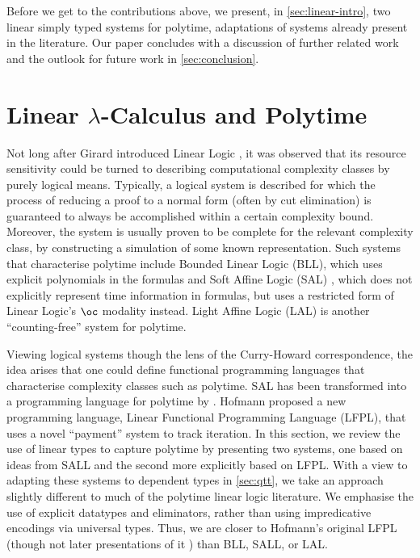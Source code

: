 \documentclass[acmsmall,review,screen,anonymous]{acmart}
\begin{document}
Before we get to the contributions above, we present, in
\autoref{sec:linear-intro}, two linear simply typed systems for
polytime, adaptations of systems already present in the
literature. Our paper concludes with a discussion of further related
work and the outlook for future work in \autoref{sec:conclusion}.

\section{Linear $\lambda$-Calculus and Polytime}
\label{sec:linear-intro}

Not long after Girard introduced Linear Logic \cite{girard87}, it was
observed that its resource sensitivity could be turned to describing
computational complexity classes by purely logical means. Typically, a
logical system is described for which the process of reducing a proof
to a normal form (often by cut elimination) is guaranteed to always be
accomplished within a certain complexity bound. Moreover, the system
is usually proven to be complete for the relevant complexity class, by
constructing a simulation of some known representation. Such systems
that characterise polytime include Bounded Linear Logic (BLL), which
uses explicit polynomials in the formulas \cite{bll} and Soft Affine
Logic (SAL) \cite{lafont}, which does not explicitly represent
time information in formulas, but uses a restricted form of Linear
Logic's $\oc$ modality instead. Light Affine Logic (LAL) \cite{lal} is
another ``counting-free'' system for polytime.

Viewing logical systems though the lens of the Curry-Howard
correspondence, the idea arises that one could define functional
programming languages that characterise complexity classes such as
polytime. SAL has been transformed into a programming language for
polytime by \cite{gaboardi}. Hofmann proposed a new programming
language, Linear Functional Programming Language (LFPL), that uses a
novel ``payment'' system to track iteration. In this section, we
review the use of linear types to capture polytime by presenting two
systems, one based on ideas from SALL and the second more explicitly
based on LFPL. With a view to adapting these systems to dependent
types in \autoref{sec:qtt}, we take an approach slightly different to
much of the polytime linear logic literature. We emphasise the use of
explicit datatypes and eliminators, rather than using impredicative
encodings via universal types. Thus, we are closer to Hofmann's
original LFPL (though not later presentations of it
\cite{dallago-hofmann}) than BLL, SALL, or LAL.
\end{document}
